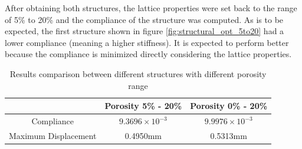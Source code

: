 After obtaining both structures, the lattice properties were set back to the range of 5\% to 20\% and the compliance of the structure was computed. As is to be expected, the first structure shown in figure \ref{fig:structural_opt_5to20} had a lower compliance (meaning a higher stiffness). It is expected to perform better because the compliance is minimized directly considering the lattice properties. 
\begin{table}[ht]
  \centering
  \begin{tabular}{c | c | c}
    & Porosity 5\% - 20\% & Porosity 0\% - 20\% \\
    \hline
    Compliance & $9.3696\times10^{-3}$ & $9.9976\times10^{-3}$ \\
    \hline
    Maximum Displacement & 0.4950mm & 0.5313mm
  \end{tabular}
  \caption{Results comparison between different structures with different porosity range}
\end{table}

